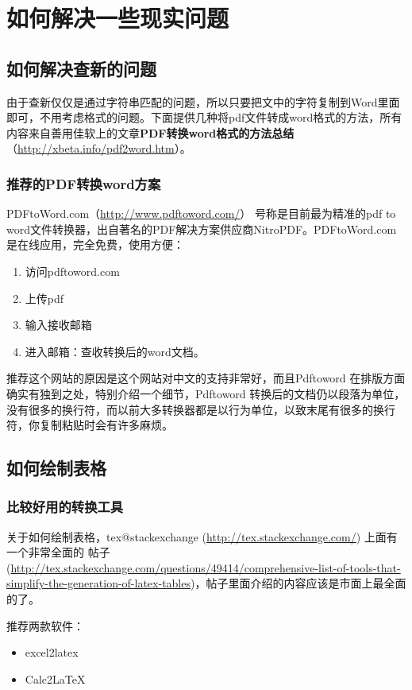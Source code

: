 \chapter{如何解决一些现实问题}

\section{如何解决查新的问题}

由于查新仅仅是通过字符串匹配的问题，所以只要把文中的字符复制到Word里面即可，不用考虑格式的问题。下面提供几种将pdf文件转成word格式的方法，所有内容来自善用佳软上的文章\textbf{PDF转换word格式的方法总结}（\url{http://xbeta.info/pdf2word.htm}）。

\subsection{推荐的PDF转换word方案}

PDFtoWord.com（\url{http://www.pdftoword.com/}） 号称是目前最为精准的pdf to word文件转换器，出自著名的PDF解决方案供应商NitroPDF。PDFtoWord.com是在线应用，完全免费，使用方便：
\begin{enumerate}
\item 访问pdftoword.com
\item 上传pdf
\item 输入接收邮箱
\item 进入邮箱：查收转换后的word文档。
\end{enumerate}
推荐这个网站的原因是这个网站对中文的支持非常好，而且Pdftoword 在排版方面确实有独到之处，特别介绍一个细节，Pdftoword 转换后的文档仍以段落为单位，没有很多的换行符，而以前大多转换器都是以行为单位，以致末尾有很多的换行符，你复制粘贴时会有许多麻烦。

\newpage

\section{如何绘制表格}

\subsection{比较好用的转换工具}
关于如何绘制表格，tex@stackexchange (\url{http://tex.stackexchange.com/}) 上面有一个非常全面的 帖子(\url{http://tex.stackexchange.com/questions/49414/comprehensive-list-of-tools-that-simplify-the-generation-of-latex-tables})，帖子里面介绍的内容应该是市面上最全面的了。

推荐两款软件：
\begin{itemize}
\item excel2latex
\item Calc2LaTeX
\end{itemize}

